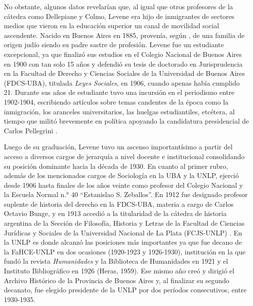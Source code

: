 No obstante, algunos datos revelarían que, al igual que otros profesores de la cátedra como Dellepiane y Colmo, Levene era hijo de inmigrantes de sectores medios que vieron en la educación superior un canal de movilidad social ascendente. Nacido en Buenos Aires en 1885, provenía, según \textcite{1628-GALVEZ2002}, de una familia de origen judío siendo su padre sastre de profesión. Levene fue un estudiante excepcional, ya que finalizó sus estudios en el Colegio Nacional de Buenos Aires en 1900 con tan solo 15 años \parencite{1530-RAJMANOVICH2016} y defendió su tesis de doctorado en Jurisprudencia en la Facultad de Derecho y Ciencias Sociales de la Universidad de Buenos Aires (FDCS-UBA), titulada \emph{Leyes Sociales}, en 1906, cuando apenas había cumplido 21. Durante sus años de estudiante tuvo una incursión en el periodismo entre 1902-1904, escribiendo artículos sobre temas candentes de la época como la inmigración, los aranceles universitarios, las huelgas estudiantiles, etcétera, al tiempo que militó brevemente en política apoyando la candidatura presidencial de Carlos Pellegrini \parencite{1526-RODRIGUEZ2001}.

Luego de su graduación, Levene tuvo un ascenso importantísimo a partir del acceso a diversos cargos de jerarquía a nivel docente e institucional consolidando su posición dominante hacia la década de 1930. En cuanto al primer rubro, además de los mencionados cargos de Sociología en la UBA y la UNLP, ejerció desde 1906 hasta finales de los años veinte como profesor del Colegio Nacional y la Escuela Normal n.° 40 \enquote{Estanislao S. Zeballos}. En 1912 fue designado profesor suplente de historia del derecho en la FDCS-UBA, materia a cargo de Carlos Octavio Bunge, y en 1913 accedió a la titularidad de la cátedra de historia argentina de la Sección de Filosofía, Historia y Letras de la Facultad de Ciencias Jurídicas y Sociales de la Universidad Nacional de La Plata (FCJS-UNLP) \parencite{1627-FINOCCHIO2001}. En la UNLP es donde alcanzó las posiciones más importantes ya que fue decano de la FaHCE-UNLP en dos ocasiones (1920-1923 y 1926-1930), institución en la que fundó la revista \emph{Humanidades} y la Biblioteca de Humanidades en 1921 y el Instituto Bibliográfico en 1926 (Heras, 1959). Ese mismo año creó y dirigió el Archivo Histórico de la Provincia de Buenos Aires y, al finalizar su segundo decanato, fue elegido presidente de la UNLP por dos períodos consecutivos, entre 1930-1935.

